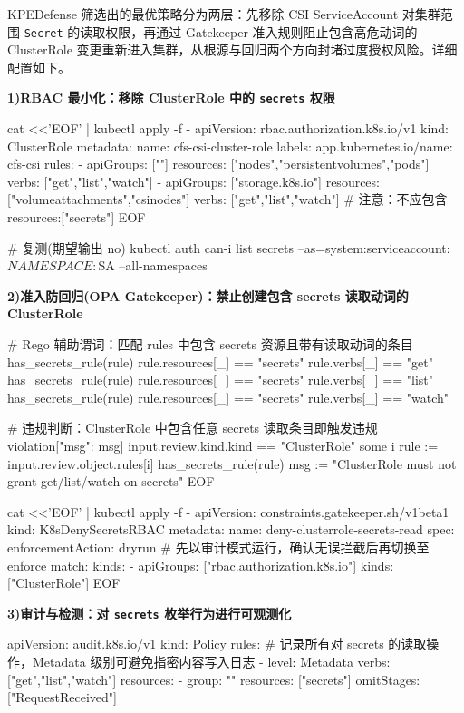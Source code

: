 KPEDefense 筛选出的最优策略分为两层：先移除 CSI ServiceAccount 对集群范围 \texttt{Secret} 的读取权限，再通过 Gatekeeper 准入规则阻止包含高危动词的 ClusterRole 变更重新进入集群，从根源与回归两个方向封堵过度授权风险。详细配置如下。

\textbf{1)RBAC 最小化：移除 ClusterRole 中的 \texttt{secrets} 权限}

\begin{AppendixCode}
cat <<'EOF' | kubectl apply -f -
apiVersion: rbac.authorization.k8s.io/v1
kind: ClusterRole
metadata:
  name: cfs-csi-cluster-role
  labels:
    app.kubernetes.io/name: cfs-csi
rules:
- apiGroups: [""]
  resources: ["nodes","persistentvolumes","pods"]
  verbs: ["get","list","watch"]
- apiGroups: ["storage.k8s.io"]
  resources: ["volumeattachments","csinodes"]
  verbs: ["get","list","watch"]
# 注意：不应包含 resources:["secrets"]
EOF

# 复测(期望输出 no)
kubectl auth can-i list secrets --as=system:serviceaccount:$NAMESPACE:$SA --all-namespaces
\end{AppendixCode}

\textbf{2)准入防回归(OPA Gatekeeper)：禁止创建包含 secrets 读取动词的 ClusterRole}
\begin{AppendixCode}
# Rego 辅助谓词：匹配 rules 中包含 secrets 资源且带有读取动词的条目
has_secrets_rule(rule) {
        rule.resources[_] == "secrets"
        rule.verbs[_] == "get"
      }
      has_secrets_rule(rule) {
        rule.resources[_] == "secrets"
        rule.verbs[_] == "list"
      }
      has_secrets_rule(rule) {
        rule.resources[_] == "secrets"
        rule.verbs[_] == "watch"
      }

      # 违规判断：ClusterRole 中包含任意 secrets 读取条目即触发违规
      violation[{"msg": msg}] {
        input.review.kind.kind == "ClusterRole"
        some i
        rule := input.review.object.rules[i]
        has_secrets_rule(rule)
        msg := "ClusterRole must not grant get/list/watch on secrets"
      }
EOF

cat <<'EOF' | kubectl apply -f -
apiVersion: constraints.gatekeeper.sh/v1beta1
kind: K8sDenySecretsRBAC
metadata:
  name: deny-clusterrole-secrets-read
spec:
  enforcementAction: dryrun  # 先以审计模式运行，确认无误拦截后再切换至 enforce
  match:
    kinds:
    - apiGroups: ["rbac.authorization.k8s.io"]
      kinds: ["ClusterRole"]
EOF
\end{AppendixCode}

\textbf{3)审计与检测：对 \texttt{secrets} 枚举行为进行可观测化}
\begin{AppendixCode}
apiVersion: audit.k8s.io/v1
kind: Policy
rules:
# 记录所有对 secrets 的读取操作，Metadata 级别可避免指密内容写入日志
- level: Metadata
  verbs: ["get","list","watch"]
  resources:
  - group: ""
    resources: ["secrets"]
  omitStages: ["RequestReceived"]
\end{AppendixCode}


